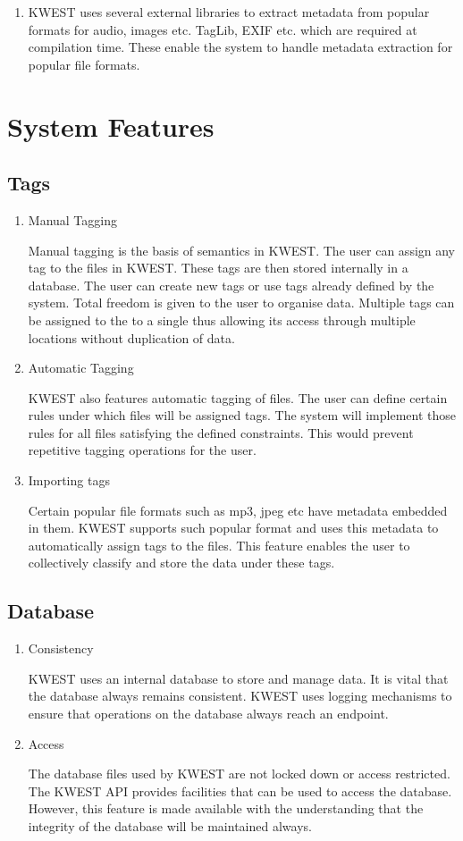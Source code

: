 \begin{enumerate}
 \item KWEST uses several external libraries to extract metadata from popular formats for
audio, images etc. TagLib, EXIF etc. which are required at compilation time. These
enable the system to handle metadata extraction for popular file formats.


 \end{enumerate} 


\section{System Features}
\subsection {Tags}
\begin{enumerate}
\item Manual Tagging 

Manual tagging is the basis of semantics in KWEST. The user can assign any tag to the files in KWEST. These tags are then stored internally in a database. The user can create new tags or use tags already defined by the system. Total freedom is given to the user to organise data. Multiple tags can be assigned to the to a single thus allowing its access through multiple locations without duplication of data.
\item Automatic Tagging 

KWEST also features automatic tagging of files. The user can define certain rules under which files will be assigned tags. The system will implement those rules for all files satisfying the defined constraints. This would prevent repetitive tagging operations for the user. 
\item Importing tags 

Certain popular file formats such as mp3, jpeg etc have metadata embedded in them. KWEST supports such popular format and uses this metadata to automatically assign tags to the files. This feature enables the user to collectively classify and store the data under these tags.
\end{enumerate}

\subsection{Database}
\begin{enumerate}
\item Consistency 

KWEST uses an internal database to store and manage data. It is vital that the database always remains consistent. KWEST uses logging mechanisms to ensure that operations on the database always reach an endpoint. 
\item Access 

The database files used by KWEST are not locked down or access restricted. The KWEST API provides facilities that can be used to access the database. However, this feature is made available with the understanding that the integrity of the database will be maintained always.
\end{enumerate}


